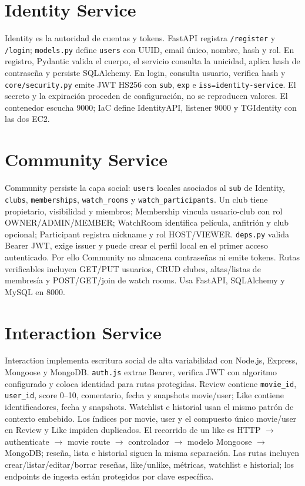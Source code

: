 \section{Identity Service}
Identity es la autoridad de cuentas y tokens. FastAPI registra \texttt{/register} y \texttt{/login}; \texttt{models.py} define \texttt{users} con UUID, email único, nombre, hash y rol. En registro, Pydantic valida el cuerpo, el servicio consulta la unicidad, aplica hash de contraseña y persiste SQLAlchemy. En login, consulta usuario, verifica hash y \texttt{core/security.py} emite JWT HS256 con \texttt{sub}, \texttt{exp} e \texttt{iss=identity-service}. El secreto y la expiración proceden de configuración, no se reproducen valores. El contenedor escucha 9000; IaC define IdentityAPI, listener 9000 y TGIdentity con las dos EC2.\section{Community Service}
Community persiste la capa social: \texttt{users} locales asociados al \texttt{sub} de Identity, \texttt{clubs}, \texttt{memberships}, \texttt{watch\_rooms} y \texttt{watch\_participants}. Un club tiene propietario, visibilidad y miembros; Membership vincula usuario-club con rol OWNER/ADMIN/MEMBER; WatchRoom identifica película, anfitrión y club opcional; Participant registra nickname y rol HOST/VIEWER. \texttt{deps.py} valida Bearer JWT, exige issuer y puede crear el perfil local en el primer acceso autenticado. Por ello Community no almacena contraseñas ni emite tokens. Rutas verificables incluyen GET/PUT usuarios, CRUD clubes, altas/listas de membresía y POST/GET/join de watch rooms. Usa FastAPI, SQLAlchemy y MySQL en 8000.
\section{Interaction Service}
Interaction implementa escritura social de alta variabilidad con Node.js, Express, Mongoose y MongoDB. \texttt{auth.js} extrae Bearer, verifica JWT con algoritmo configurado y coloca identidad para rutas protegidas. Review contiene \texttt{movie\_id}, \texttt{user\_id}, score 0--10, comentario, fecha y snapshots movie/user; Like contiene identificadores, fecha y snapshots. Watchlist e historial usan el mismo patrón de contexto embebido. Los índices por movie, user y el compuesto único movie/user en Review y Like impiden duplicados. El recorrido de un like es HTTP $\rightarrow$ authenticate $\rightarrow$ movie route $\rightarrow$ controlador $\rightarrow$ modelo Mongoose $\rightarrow$ MongoDB; reseña, lista e historial siguen la misma separación. Las rutas incluyen crear/listar/editar/borrar reseñas, like/unlike, métricas, watchlist e historial; los endpoints de ingesta están protegidos por clave específica.
